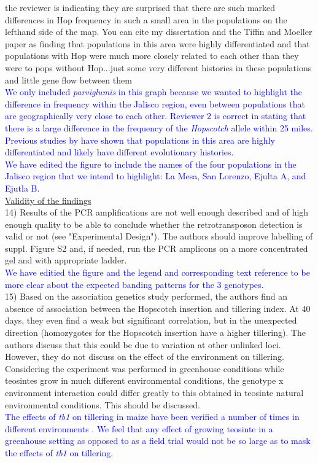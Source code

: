 \documentclass[11pt]{article}
\newcommand{\res}[1]{\noindent \textcolor{blue}{{#1}} \\}
\newcommand{\mbh}[1]{\noindent \textcolor{Dandelion}{{#1}}\\}
\begin{document}
\mbh{the reviewer is indicating they are surprised that there are such marked differences in Hop frequency in such a small area in the populations on the lefthand side of the map.  You can cite my dissertation and the Tiffin and Moeller paper as finding that populations in this area were highly differentiated and that populations with Hop were much more closely related to each other than they were to pops without Hop...just some very different histories in these populations and little gene flow between them}

\res{We only included \emph{parviglumis} in this graph because we wanted to highlight the difference in frequency within the Jalisco region, even between populations that are geographically very close to each other. Reviewer 2 is correct in stating that there is a large difference in the frequency of the \emph{Hopscotch} allele within 25 miles. Previous studies by \citet{Hufford2010; Moeller01072007} have shown that populations in this area are highly differentiated and likely have different evolutionary histories.}

\res{We have edited the figure to include the names of the four populations in the Jalisco region that we intend to highlight: La Mesa, San Lorenzo, Ejulta A, and Ejutla B.}


\underline{Validity of the findings}\\

14) Results of the PCR amplifications are not well enough described and of high enough quality to be able to conclude whether the retrotransposon detection is valid or not (see "Experimental Design"). The authors should improve labelling of suppl. Figure S2 and, if needed, run the PCR amplicons on a more concentrated gel and with appropriate ladder.\\

\res{We have editied the figure and the legend and corresponding text reference to be more clear about the expected banding patterns for the 3 genotypes.}

15) Based on the association genetics study performed, the authors find an absence of association between the Hopscotch insertion and tillering index. At 40 days, they even find a weak but significant correlation, but in the unexpected direction (homozygotes for the Hopscotch insertion have a higher tillering). The authors discuss that this could be due to variation at other unlinked loci. However, they do not discuss on the effect of the environment on tillering. Considering the experiment was performed in greenhouse conditions while teosintes grow in much different environmental conditions, the genotype x environment interaction could differ greatly to this obtained in teosinte natural environmental conditions. This should be discussed.\\

\res{The effects of \emph{tb1} on tillering in maize have been verified a number of times in different environments \citet{Briggs2007, Clark2006, StuderDoebley2012, Studer2011}. We feel that any effect of growing teosinte in a greenhouse setting as opposed to as a field trial would not be so large as to mask the effects of \emph{tb1} on tillering.}



\end{document}
